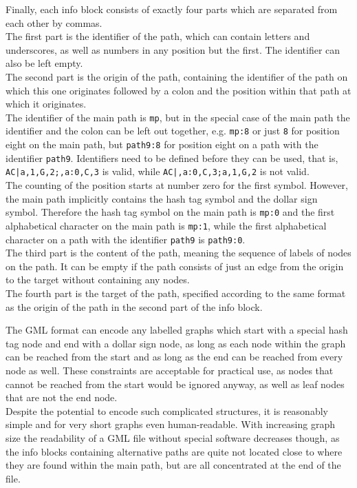 \documentclass[a4paper,12pt,twoside,BCOR=10mm]{scrbook}
\begin{document}
Finally, each info block consists of exactly four parts which are separated from each other by commas. \\
The first part is the identifier of the path, which can contain letters and underscores, 
as well as numbers in any position but the first. 
The identifier can also be left empty. \\
The second part is the origin of the path, 
containing the identifier of the path on which this one 
originates followed by a colon and the position within that path 
at which it originates. \\
The identifier of the main path is \texttt{mp}, but in the special case of the main path the 
identifier and the colon can be left out together, e.g. \texttt{mp:8} or just \texttt{8} for position eight 
on the main path, but \texttt{path9:8} for position eight on a path with the identifier \texttt{path9}.
Identifiers need to be defined before they can be used, that 
is, \texttt{AC|a,1,G,2;,a:0,C,3} is valid, while \texttt{AC|,a:0,C,3;a,1,G,2} is not valid. \\
The counting of the position starts at number zero for the first symbol. 
However, the main path implicitly contains the hash tag symbol and the dollar sign symbol. 
Therefore the hash tag symbol on the main path is \texttt{mp:0} and 
the first alphabetical character on the main path is \texttt{mp:1}, 
while the first alphabetical character on a path with the identifier \texttt{path9} is \texttt{path9:0}. \\
The third part is the content of the path, meaning the sequence of labels of nodes on the path. 
It can be empty if the path consists of just an edge from the origin to the target without containing any nodes. \\
The fourth part is the target of the path, 
specified according to the same format as the origin of the path in the second part of the info block.

The GML format can encode any labelled graphs which start with a special hash tag node 
and end with a dollar sign node, as long as each node within the graph 
can be reached from the start and as long as the end can be reached from 
every node as well. These constraints are acceptable for practical use, 
as nodes that cannot be reached from the start would be ignored anyway, 
as well as leaf nodes that are not the end node. \\
Despite the potential to encode such complicated structures, it is reasonably 
simple and for very short graphs even human-readable. 
With increasing graph size the readability of a GML file without special software 
decreases though, as the info blocks containing alternative paths are quite not 
located close to where they are found within the main path, but are all concentrated at the end of the file.
\end{document}
